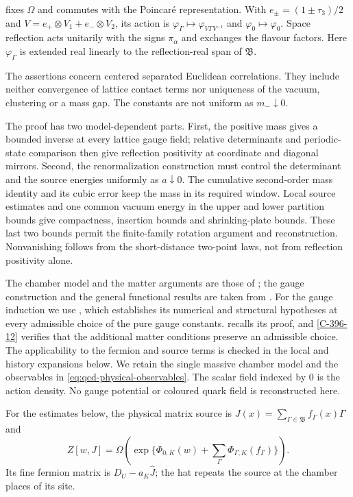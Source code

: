 \documentclass[11pt,letterpaper,reqno]{amsart}
\makeatletter
\theoremstyle{definition}
\newcommand{\ms@majorstart}{%
  \pushQED{\qed}\renewcommand{\qedsymbol}{$\blacksquare\square$}}
\newenvironment{theorem}[1][]{\ms@majorstart\ms@theorem[#1]}
  {\popQED\endms@theorem}
\theoremstyle{remark}
\makeatother
\begin{document}
\begin{theorem}[The massive two-colour theory]
\begin{enumerate}[label=\textup{(\roman*)}]
fixes $\Omega$ and commutes with the Poincar\'e representation.
With $e_\pm=(1\pm\tau_3)/2$ and
$V=e_+\otimes V_1+e_-\otimes V_2$, its action is
$\varphi_\Gamma\mapsto\varphi_{V\Gamma V^{-1}}$ and
$\varphi_0\mapsto\varphi_0$. Space reflection acts unitarily
with the signs $\pi_\alpha$ and exchanges the flavour factors.
Here $\varphi_\Gamma$ is extended real linearly to the reflection-real span of $\mathfrak B$.
\end{enumerate}
The assertions concern centered separated Euclidean correlations.
They include neither convergence of lattice contact terms nor
uniqueness of the vacuum, clustering or a mass gap. The constants
are not uniform as $m_-\downarrow0$.
\end{theorem}

The proof has two model-dependent parts. First, the positive mass
gives a bounded inverse at every lattice gauge field; relative
determinants and periodic-state comparison then give reflection
positivity at coordinate and diagonal mirrors. Second, the
renormalization construction must control the determinant and
the source energies uniformly as $a\downarrow0$. The cumulative
second-order mass identity and its cubic error keep the mass
in its required window. Local source estimates and one common
vacuum energy in the upper and lower partition bounds give
compactness, insertion bounds and shrinking-plate bounds.
These last two bounds permit the finite-family rotation argument
and reconstruction. Nonvanishing follows from the short-distance
two-point laws, not from reflection positivity alone.

The chamber model and the matter arguments are those of
\cite{fermion-notes}; the gauge construction and the general
functional results are taken from \cite{gauge-notes,YMM1}.
For the gauge induction we use
\cite[Corollary II-202-43]{gauge-notes}, which establishes
its numerical and structural hypotheses at every admissible
choice of the pure gauge constants. 
recalls its proof, and \cref{C-396-12} verifies that the
additional matter conditions preserve an admissible choice.
The applicability to the fermion and source terms is checked
in the local and history expansions below. We retain the
single massive chamber model and the observables in
\eqref{eq:qcd-physical-observables}. The scalar field indexed
by $0$ is the action density. No gauge potential or coloured
quark field is reconstructed here.

For the estimates below, the physical matrix source is
$J(x)=\sum_{\Gamma\in\mathfrak B}f_\Gamma(x)\Gamma$ and
\[
 Z[w,J]=\Omega\!\left(
     \exp\{\Phi_{0,K}(w)+\sum_\Gamma\Phi_{\Gamma,K}(f_\Gamma)\}
                  \right).
\]
Its fine fermion matrix is $D_U-a_K\hat J$; the hat repeats
the source at the chamber places of its site.
\end{document}
